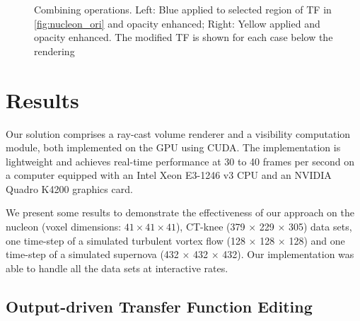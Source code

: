 \documentclass[twoside,twocolumn,10pt]{article}
\begin{document}
\begin{figure}
	\caption{Combining operations. Left: Blue applied to selected region of TF in \autoref{fig:nucleon_ori} and opacity enhanced; Right: Yellow applied and opacity enhanced. The modified TF is shown for each case below the rendering}
	\label{fig:Nucleon_2}
\end{figure}


\section{Results}

Our solution comprises a ray-cast volume renderer and a visibility computation module, both implemented on the GPU using CUDA.
The implementation is lightweight and achieves real-time performance at 30 to 40 frames per second on a computer equipped with an Intel Xeon E3-1246 v3 CPU and an NVIDIA Quadro K4200 graphics card.

We present some results to demonstrate the effectiveness of our approach on the nucleon (voxel dimensions: $ 41 \times 41 \times 41 $), CT-knee (379 $ \times $ 229 $ \times $ 305) data sets, one time-step of a simulated turbulent vortex flow (128 $\times$ 128 $\times$ 128) and one time-step of a simulated supernova (432 $\times$ 432 $\times$ 432). Our implementation was able to handle all the data sets at interactive rates.

\subsection{Output-driven Transfer Function Editing}
\end{document}
